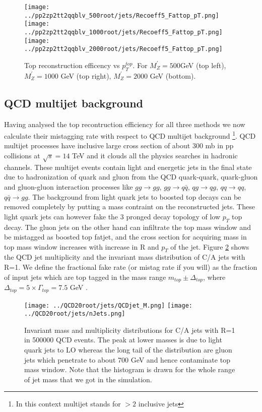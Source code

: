 \documentclass[12pt,a4paper]{article}		%
\begin{document}
\begin{figure}[h]
	\begin{centering}	
		\texttt{[image: ../pp2zp2tt2qqblv\_500root/jets/Recoeff5\_Fattop\_pT.png]} 
		\texttt{[image: ../pp2zp2tt2qqblv\_1000root/jets/Recoeff5\_Fattop\_pT.png]} 
		\texttt{[image: ../pp2zp2tt2qqblv\_2000root/jets/Recoeff5\_Fattop\_pT.png]}
		\caption{Top reconstruction efficency vs $p_T^{top}$. For $M_Z^\prime = 500$GeV (top left), $M_Z^\prime = 1000$ GeV (top right), $M_Z^\prime = 2000$ GeV (bottom).  }
		\label{recoeff_vs_pt}
		\centering
	\end{centering} 		
\end{figure}   

\newpage
\subsection{QCD multijet background}

Having analysed the top recontruction efficiency for all three methods we now calculate their mistagging rate with respect to QCD multijet background \footnote{In this context multijet stands for $> 2$ inclusive jets}. QCD multijet processes have inclusive large cross section of about 300 mb in pp collisions at $\sqrt{s} = 14$ TeV \cite{pythia} and it clouds all the physics searches in hadronic channels. These multijet events contain light and energetic jets in the final state due to hadronization of quark and gluon from the QCD quark-quark, quark-gluon and gluon-gluon interaction processes like $gg \to gg$, $gg \to q\bar{q}$, $qg \to qg$, $qq \to qq$, $q \bar{q} \to gg$. The background from light quark jets to boosted top decays can be removed completely by putting a mass contraint on the reconstructed jets. These light quark jets can however fake the 3 pronged decay topology of low $p_T$ top decay. The gluon jets on the other hand can infiltrate the top mass window and be mistagged as boosted top fatjet, and the cross section for acquiring mass in top mass window increases with increase in R and $p_T$ of the jet. Figure \ref{jetprop} shows the QCD jet multiplicity and the invariant mass distribution of C/A jets with R=1. We define the fractional fake rate (or mistag rate if you will) as the fraction of input jets which are top tagged in the mass range $m_{top} \pm \Delta_{top}$, where $\Delta_{top} = 5 \times \Gamma_{top} = 7.5$ GeV . 
\begin{figure}[h]
	\begin{centering}	
		\texttt{[image: ../QCD20root/jets/QCDjet\_M.png]} 
		\texttt{[image: ../QCD20root/jets/nJets.png]} 
		\caption{ Invariant mass and multiplicity distributions for C/A jets with R=1 in 500000 QCD events. The peak at lower masses is due to light quark jets to LO whereas the long tail of the distribution are gluon jets which penetrate to about 700 GeV and hence contaminate top mass window. Note that the histogram is drawn for the whole range of jet mass that we got in the simulation.   }
		\label{jetprop}
		\centering
	\end{centering} 		
\end{figure} 
\end{document}
